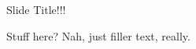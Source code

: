 \begin{frame}[t]{Slide Title!!!}

  \hspace*{-.5in}
  \begin{minipage}{3.5in}
  \begin{center}

	Stuff here? Nah, just filler text, really.

  \end{center}
  \end{minipage}

\end{frame}
